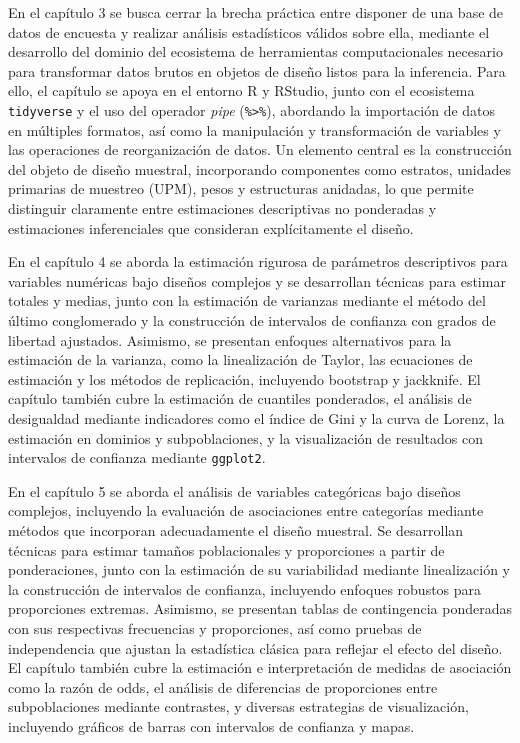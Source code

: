 \documentclass[
  spanish,
  12pt,
]{book}
\begin{document}
En el capítulo 3 se busca cerrar la brecha práctica entre disponer de una base de datos de encuesta y realizar análisis estadísticos válidos sobre ella, mediante el desarrollo del dominio del ecosistema de herramientas computacionales necesario para transformar datos brutos en objetos de diseño listos para la inferencia. Para ello, el capítulo se apoya en el entorno R y RStudio, junto con el ecosistema \texttt{tidyverse} y el uso del operador \emph{pipe} (\texttt{\%\textgreater{}\%}), abordando la importación de datos en múltiples formatos, así como la manipulación y transformación de variables y las operaciones de reorganización de datos. Un elemento central es la construcción del objeto de diseño muestral, incorporando componentes como estratos, unidades primarias de muestreo (UPM), pesos y estructuras anidadas, lo que permite distinguir claramente entre estimaciones descriptivas no ponderadas y estimaciones inferenciales que consideran explícitamente el diseño.

En el capítulo 4 se aborda la estimación rigurosa de parámetros descriptivos para variables numéricas bajo diseños complejos y se desarrollan técnicas para estimar totales y medias, junto con la estimación de varianzas mediante el método del último conglomerado y la construcción de intervalos de confianza con grados de libertad ajustados. Asimismo, se presentan enfoques alternativos para la estimación de la varianza, como la linealización de Taylor, las ecuaciones de estimación y los métodos de replicación, incluyendo bootstrap y jackknife. El capítulo también cubre la estimación de cuantiles ponderados, el análisis de desigualdad mediante indicadores como el índice de Gini y la curva de Lorenz, la estimación en dominios y subpoblaciones, y la visualización de resultados con intervalos de confianza mediante \texttt{ggplot2}.

En el capítulo 5 se aborda el análisis de variables categóricas bajo diseños complejos, incluyendo la evaluación de asociaciones entre categorías mediante métodos que incorporan adecuadamente el diseño muestral. Se desarrollan técnicas para estimar tamaños poblacionales y proporciones a partir de ponderaciones, junto con la estimación de su variabilidad mediante linealización y la construcción de intervalos de confianza, incluyendo enfoques robustos para proporciones extremas. Asimismo, se presentan tablas de contingencia ponderadas con sus respectivas frecuencias y proporciones, así como pruebas de independencia que ajustan la estadística clásica para reflejar el efecto del diseño. El capítulo también cubre la estimación e interpretación de medidas de asociación como la razón de odds, el análisis de diferencias de proporciones entre subpoblaciones mediante contrastes, y diversas estrategias de visualización, incluyendo gráficos de barras con intervalos de confianza y mapas.
\end{document}
